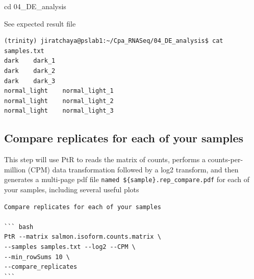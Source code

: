 \documentclass[
  letterpaper,
  DIV=11,
  numbers=noendperiod]{scrreprt}
\newenvironment{Shaded}{\begin{snugshade}}{\end{snugshade}}
\newcommand{\BuiltInTok}[1]{\textcolor[rgb]{0.00,0.23,0.31}{#1}}
\newcommand{\NormalTok}[1]{\textcolor[rgb]{0.00,0.23,0.31}{#1}}
\begin{document}
\begin{tcolorbox}
\begin{enumerate}
\begin{Shaded}
\begin{Highlighting}[]
\BuiltInTok{cd}\NormalTok{ 04\_DE\_analysis}
\end{Highlighting}
\end{Shaded}

  See expected result file

\begin{verbatim}
(trinity) jiratchaya@pslab1:~/Cpa_RNASeq/04_DE_analysis$ cat samples.txt
dark    dark_1
dark    dark_2
dark    dark_3
normal_light    normal_light_1
normal_light    normal_light_2
normal_light    normal_light_3
\end{verbatim}
\end{enumerate}

\end{tcolorbox}

\hypertarget{compare-replicates-for-each-of-your-samples}{%
\subsection{Compare replicates for each of your
samples}\label{compare-replicates-for-each-of-your-samples}}

This step will use PtR to reads the matrix of counts, performs a
counts-per-million (CPM) data transformation followed by a log2
transform, and then generates a multi-page pdf file
\texttt{named\ \$\{sample\}.rep\_compare.pdf} for each of your samples,
including several useful plots

\begin{tcolorbox}[enhanced jigsaw, breakable, bottomrule=.15mm, left=2mm, coltitle=black, opacityback=0, colframe=quarto-callout-note-color-frame, toprule=.15mm, opacitybacktitle=0.6, colbacktitle=quarto-callout-note-color!10!white, bottomtitle=1mm, colback=white, toptitle=1mm, titlerule=0mm, rightrule=.15mm, arc=.35mm, title=\textcolor{quarto-callout-note-color}{\faInfo}\hspace{0.5em}{Activity}, leftrule=.75mm]

\begin{verbatim}
Compare replicates for each of your samples

``` bash
PtR --matrix salmon.isoform.counts.matrix \
--samples samples.txt --log2 --CPM \
--min_rowSums 10 \
--compare_replicates
```
\end{verbatim}

\end{tcolorbox}
\end{document}
